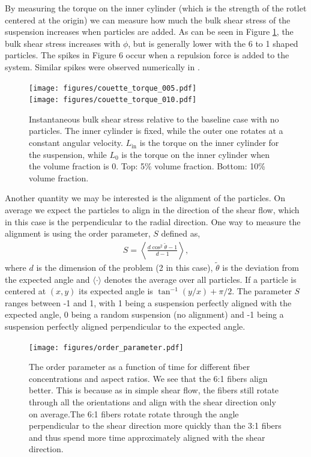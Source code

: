 \documentclass[preprint, 10pt]{elsarticle}
\begin{document}
By measuring the torque on the inner cylinder (which is the strength of the
rotlet centered at the origin) we can measure how much the bulk shear stress of the suspension
increases when particles are added. As can be seen in Figure
\ref{fig:torque}, the bulk shear stress increases with $\phi$, but is
generally lower with the 6 to 1 shaped particles. The spikes in Figure 6 occur
when a repulsion force is added to the system. Similar spikes were observed numerically in
\cite{Lu2017}.
\begin{figure}[!h]
\begin{center}
\texttt{[image: figures/couette\_torque\_005.pdf]}\\
\texttt{[image: figures/couette\_torque\_010.pdf]}\\
\end{center}
\caption{Instantaneous bulk shear stress relative to the baseline case with no particles. The inner
cylinder is fixed, while the outer one rotates at a constant angular velocity. $L_{\text{in}}$ is
the torque on the inner cylinder for the suspension, while $L_0$ is the torque on the inner cylinder
when the volume fraction is 0. Top: 5\% volume fraction. Bottom: 10\% volume fraction.}\label{fig:torque}
\end{figure} 

Another quantity we may be interested is the alignment of the particles. On
average we expect the particles to align in the direction of the shear flow,
which in this case is the perpendicular to the radial direction. One way
to measure the alignment is using the order parameter, $S$ defined as,
\begin{align*}
  S = \left\langle \frac{d \cos^2\tilde{\theta} - 1}{d - 1} \right\rangle,
\end{align*}
where $d$ is the dimension of the problem (2 in this case),
$\tilde{\theta}$ is the deviation from the expected angle and $\langle
\cdot\rangle$ denotes the average over all particles. If a particle is
centered at $(x,y)$ its expected angle is $\tan^{-1}(y/x) + \pi/2$. The
parameter $S$ ranges between -1 and 1, with 1 being a suspension
perfectly aligned with the expected angle, 0 being a random suspension
(no alignment) and -1 being a suspension perfectly aligned perpendicular
to the expected angle.

\begin{figure}[!h]
\begin{center}
\texttt{[image: figures/order\_parameter.pdf]}\\
\end{center}
\caption{The order parameter as a function of time for different fiber concentrations and aspect
ratios. We see that the 6:1 fibers align better. This is because as in simple shear flow, the fibers
still rotate through all the orientations and align with the shear direction only on average.The 6:1
fibers rotate rotate through the angle perpendicular to the shear direction more quickly than the
3:1 fibers and thus spend more time approximately aligned with the shear direction.
}\label{fig:angles}
\end{figure} 
\end{document}
